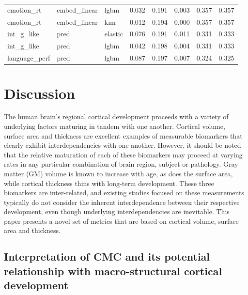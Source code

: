 \documentclass{article}
\begin{document}
\begin{table}
\begin{tabular}{lllrrrrr}
	emotion\_rt & embed\_linear & lgbm & 0.032 & 0.191 & 0.003 & 0.357 & 0.357 \\
	emotion\_rt & embed\_linear & knn & 0.012 & 0.194 & 0.000 & 0.357 & 0.357 \\
	int\_g\_like & pred & elastic & 0.076 & 0.191 & 0.011 & 0.331 & 0.333 \\
	int\_g\_like & pred & lgbm & 0.042 & 0.198 & 0.004 & 0.331 & 0.333 \\
	language\_perf & pred & lgbm & 0.087 & 0.197 & 0.007 & 0.324 & 0.325 \\
	\bottomrule
\end{tabular}
\label{tab:cmc-feature-select}
\end{table}


\section{Discussion} \label{sec:discussion}

The human brain's regional cortical development proceeds with a variety of
underlying factors maturing in tandem with one another. Cortical volume,
surface area and thickness are excellent examples of measurable biomarkers
that clearly exhibit interdependencies with one another. However, it should
be noted that the relative maturation of each of these biomarkers may proceed
at varying rates in any particular combination of brain region, subject or
pathology. Gray matter (GM) volume is known to increase with age, as does the
surface area, while cortical thickness thins with long-term development.
These three biomarkers are inter-related, and existing studies focused on
these measurements typically do not consider the inherent interdependence
between their respective development, even though underlying
interdependencies are inevitable. This paper presents a novel set of metrics
that are based on cortical volume, surface area and thickness.

\subsection{Interpretation of CMC and its potential relationship with macro-structural cortical development}
\end{document}
